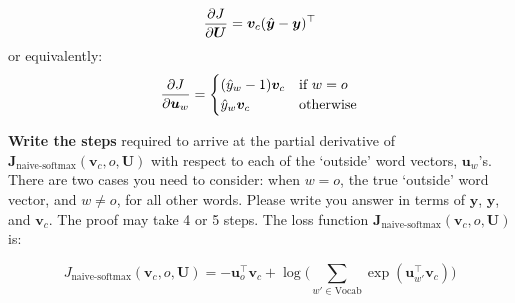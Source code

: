\begin{enumerate}[(a)]
        \begin{equation}
            {\partial J \over \partial \bm U } = {\bm v_c} (\hat{\bm y} - \bm y)^\top    
        \end{equation}
        or equivalently:
        \begin{align}
            {\partial J\over \partial \bm u_w} = 
            \begin{cases}
                (\hat{y}_w-1) {\bm v_c} & \text{if } w=o \\
            \hat{y}_w{\bm v_c} & \text{otherwise}
            \end{cases}
        \end{align}
    
        \textbf{Write the steps} required to arrive at the partial derivative of $\bm J_{\text{naive-softmax}}(\bm v_c, o, \bm U)$ with respect to each of the `outside' word vectors, $\bm u_w$'s. There are two cases you need to consider: when $w=o$, the true `outside' word vector, and $w \neq o$, for all other words. Please write you answer in terms of $\bm y$, $\hat{\bm y}$, and $\bm v_c$. The proof may take 4 or 5 steps. The loss function $\bm J_{\text{naive-softmax}}(\bm v_c, o, \bm U)$ is:

            \begin{equation*}
            J_{\text{naive-softmax}}(\bm v_c, o, \bm U) = - \bm u_{o}^\top \bm v_c + \log \bigg( \sum_{w' \in \text{Vocab}} \exp(\bm u_{w'}^\top \bm v_c) \bigg)
            \end{equation*}
\end{enumerate}